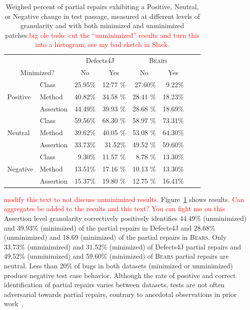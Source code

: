 \documentclass[10pt, conference]{IEEEtran}
\newcommand\todo[1]{\textcolor{red}{#1}}
\newcommand\bears{\textsc{Bears}\xspace}
\begin{document}
\begin{table}
{\begin{center}
\begin{tabular}{ll|rr|rrrr}
\toprule
\multicolumn{2}{c}{}&\multicolumn{2}{c}{Defects4J} & \multicolumn{2}{c}{\bears} \\
\multicolumn{2}{c}{Minimized?} & \multicolumn{1}{c}{No} & \multicolumn{1}{c}{Yes} & \multicolumn{1}{c}{No} & \multicolumn{1}{c}{Yes}  \\
\midrule
\multirow{3}{*}{Positive} & Class & 25.95\% & 12.77 \% & 27.60\% & 9.22\%  \\
 & Method & 40.82\% & 34.58 \% & 28.41 \% & 18.23\%  \\
 & Assertion & 44.49\% & 39.93 \% & 28.68 \% & 18.69\%  \\ 
\midrule
\multirow{3}{*}{Neutral} & Class & 59.56\% & 68.30 \% & 58.97 \% & 73.31\% \\
 & Method & 39.62\% & 40.05 \% & 53.08 \% & 64.30\%  \\
 & Assertion & 33.73\% & 31.52\% & 49.52 \% &  59.60\%  \\ 
\midrule
\multirow{3}{*}{Negative} & Class & 9.30\% & 11.57 \% & 8.78 \% & 13.30\%  \\
 & Method & 13.51\% & 17.16 \% & 10.13 \% & 13.30\%  \\
 & Assertion & 15.37\% & 19.80 \% & 12.75 \% &  16.41\%  \\ 
\bottomrule
\end{tabular}
\end{center}}
\caption{Weighed percent of partial repairs exhibiting a {\normalfont Positive}, {\normalfont Neutral},
	or {\normalfont Negative} change in test passage, measured at different levels of granularity
	and with both minimized and unminimized patches.\todo{big ole todo: cut
          the ``unminimized'' results and turn this into a histogram; see my bad
          sketch in Slack.}}
\label{yiweitable}
\end{table}

\todo{modify this text to not discuss unminimized results.}
Figure~\ref{yiweitable} shows results. \todo{Can aggregates be added to the
  results and this text? You can fight me on this}
Assertion level granularity correctively positively identifies
44.49\% (unminimized) and 39.93\% (minimized) of the partial repairs in Defects4J
and 28.68\% (unminimized) and 18.69 (minimized) of the partial repairs in \bears.
Only 33.73\% (unminimized) and 31.52\% (minimized) of Defects4J partial repairs and 
49.52\% (unminimized) and 59.60\% (minimized)
of \bears partial repairs are neutral. Less than 20\% of bugs in both datasets
(minimized or unminimized) produce negative test case behavior.
Although the rate of positive and correct identification of partial repairs varies between datasets,
tests are not often adversarial towards partial repairs, contrary to anecdotal
observations in prior work~\cite{gecco09}.
\end{document}
